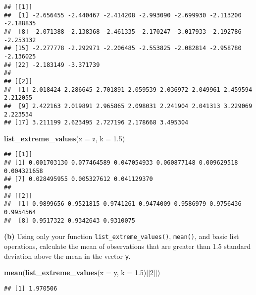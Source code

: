 \documentclass[]{article}
\newenvironment{Shaded}{\begin{snugshade}}{\end{snugshade}}
\newcommand{\DataTypeTok}[1]{\textcolor[rgb]{0.13,0.29,0.53}{#1}}
\newcommand{\DecValTok}[1]{\textcolor[rgb]{0.00,0.00,0.81}{#1}}
\newcommand{\FloatTok}[1]{\textcolor[rgb]{0.00,0.00,0.81}{#1}}
\newcommand{\KeywordTok}[1]{\textcolor[rgb]{0.13,0.29,0.53}{\textbf{#1}}}
\newcommand{\NormalTok}[1]{#1}
\begin{document}
\begin{verbatim}
## [[1]]
##  [1] -2.656455 -2.440467 -2.414208 -2.993090 -2.699930 -2.113200 -2.188835
##  [8] -2.071388 -2.138368 -2.461335 -2.170247 -3.017933 -2.192786 -2.253132
## [15] -2.277778 -2.292971 -2.206485 -2.553825 -2.082814 -2.958780 -2.136025
## [22] -2.183149 -3.371739
## 
## [[2]]
##  [1] 2.018424 2.286645 2.701891 2.059539 2.036972 2.049961 2.459594 2.212055
##  [9] 2.422163 2.019891 2.965865 2.098031 2.241904 2.041313 3.229069 2.223534
## [17] 3.211199 2.623495 2.727196 2.178668 3.495304
\end{verbatim}

\begin{Shaded}
\begin{Highlighting}[]
\KeywordTok{list_extreme_values}\NormalTok{(}\DataTypeTok{x =}\NormalTok{ z, }\DataTypeTok{k =} \FloatTok{1.5}\NormalTok{)}
\end{Highlighting}
\end{Shaded}

\begin{verbatim}
## [[1]]
## [1] 0.001703130 0.077464589 0.047054933 0.060877148 0.009629518 0.004321658
## [7] 0.028495955 0.005327612 0.041129370
## 
## [[2]]
##  [1] 0.9899656 0.9521815 0.9741261 0.9474009 0.9586979 0.9756436 0.9954564
##  [8] 0.9517322 0.9342643 0.9310075
\end{verbatim}

\textbf{(b)} Using only your function \texttt{list\_extreme\_values()},
\texttt{mean()}, and basic list operations, calculate the mean of
observations that are greater than 1.5 standard deviation above the mean
in the vector \texttt{y}.

\begin{Shaded}
\begin{Highlighting}[]
\KeywordTok{mean}\NormalTok{(}\KeywordTok{list_extreme_values}\NormalTok{(}\DataTypeTok{x =}\NormalTok{ y, }\DataTypeTok{k =} \FloatTok{1.5}\NormalTok{)[[}\DecValTok{2}\NormalTok{]])}
\end{Highlighting}
\end{Shaded}

\begin{verbatim}
## [1] 1.970506
\end{verbatim}
\end{document}

